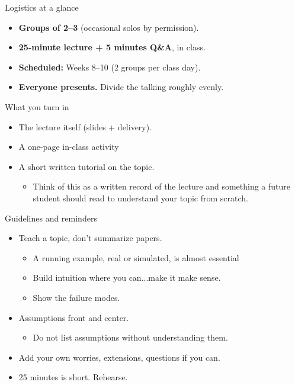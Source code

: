 \documentclass[xcolor=dvipsnames]{beamer}
\begin{document}
\begin{frame}{Logistics at a glance}
\begin{itemize}
    \item<1-> \textbf{Groups of 2--3} (occasional solos by permission).
    \medskip
    \item<2-> \textbf{25-minute lecture + 5 minutes Q\&A}, in class.
    \medskip
    \item<3-> \textbf{Scheduled:} Weeks 8--10 (2 groups per class day).
    \medskip
    \item<4-> \textbf{Everyone presents.} Divide the talking roughly evenly.
\end{itemize}
\end{frame}

\begin{frame}{What you turn in}
\begin{itemize}
    \item<1-> The lecture itself (slides + delivery).
    \medskip
    \item<2-> A one-page in-class activity
    \medskip
    \item<3-> A short written tutorial on the topic. 
    \begin{itemize}
    \item<4-> Think of this as a written record of the lecture and something a future student should read to understand your topic from scratch.
    \end{itemize}
\end{itemize}
\end{frame}



\begin{frame}{Guidelines and reminders}
\small
\begin{itemize}
    \item<1-> Teach a topic, don't summarize papers.
        \begin{itemize}
    	\item A running example, real or simulated, is almost essential
    	\item Build intuition where you can...make it make sense.
    	\item Show the failure modes.
    	\end{itemize}
    \item<2-> Assumptions front and center.
    \begin{itemize}
    \item<3-> Do not list assumptions without understanding them.
    \end{itemize}
    \item<4-> Add your own worries, extensions, questions if you can.
    \item<5-> 25 minutes is short. Rehearse.
\end{itemize}
\end{frame}
\end{document}
